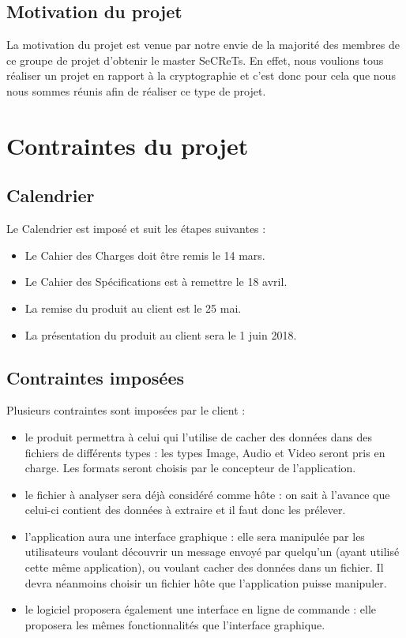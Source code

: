\documentclass[11pt]{article}
\begin{document}
\subsection{Motivation du projet}

La motivation du projet est venue par notre envie de la majorité des membres de ce groupe de projet d'obtenir le master SeCReTs. 
En effet, nous voulions tous réaliser un projet en rapport à la cryptographie et c'est donc pour cela que nous nous sommes réunis afin de réaliser ce type de projet. 

\section{Contraintes du projet}

\subsection{Calendrier}

Le Calendrier est imposé et suit les étapes suivantes : 

\begin {itemize}
\item Le Cahier des Charges doit être remis le 14 mars. 
\item Le Cahier des Spécifications est à remettre le 18 avril. 
\item La remise du produit au client est le 25 mai. 
\item La présentation du produit au client sera le 1 juin 2018.  
\end{itemize}


\subsection{Contraintes imposées}
Plusieurs contraintes sont imposées par le client : 
\begin{itemize}
\item le produit permettra à celui qui l'utilise de cacher des données dans des fichiers de différents types : les types Image, Audio et Video seront pris en charge. Les formats seront choisis par le concepteur de l'application. 
\item le fichier à analyser sera déjà considéré comme hôte : on sait à l'avance que celui-ci contient des données à extraire et il faut donc les prélever. 
\item l'application aura une interface graphique : elle sera manipulée par les utilisateurs voulant découvrir un message envoyé par quelqu'un (ayant utilisé cette même application), ou voulant cacher des données dans un fichier. 
Il devra néanmoins choisir un fichier hôte que l'application puisse manipuler. 
\item le logiciel proposera également une interface en ligne de commande : elle proposera les mêmes fonctionnalités que l'interface graphique. 
\end{itemize}
\end{document}

